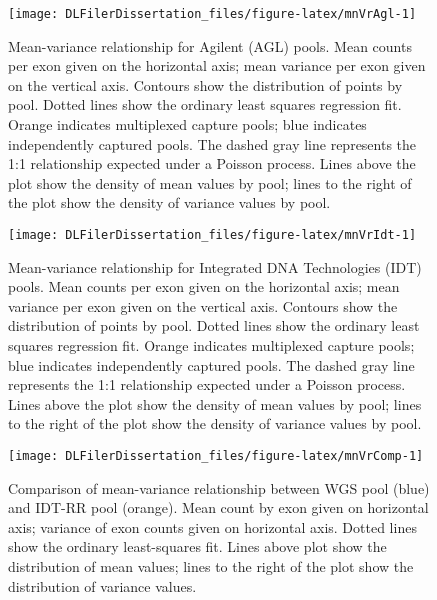\documentclass[11pt,letterpaper]{book}
\begin{document}
\begin{figure}

{\centering \texttt{[image: DLFilerDissertation\_files/figure-latex/mnVrAgl-1]} 

}

\caption[Mean-variance relationship for Agilent (AGL) pools.]{Mean-variance relationship for Agilent (AGL) pools. Mean counts per exon given on the horizontal axis; mean variance per exon given on the vertical axis. Contours show the distribution of points by pool. Dotted lines show the ordinary least squares regression fit. Orange indicates multiplexed capture pools; blue indicates independently captured pools. The dashed gray line represents the 1:1 relationship expected under a Poisson process. Lines above the plot show the density of mean values by pool; lines to the right of the plot show the density of variance values by pool.}\label{fig:mnVrAgl}
\end{figure}



\begin{figure}

{\centering \texttt{[image: DLFilerDissertation\_files/figure-latex/mnVrIdt-1]} 

}

\caption[Mean-variance relationship for Integrated DNA Technologies (IDT) pools.]{Mean-variance relationship for Integrated DNA Technologies (IDT) pools. Mean counts per exon given on the horizontal axis; mean variance per exon given on the vertical axis. Contours show the distribution of points by pool. Dotted lines show the ordinary least squares regression fit. Orange indicates multiplexed capture pools; blue indicates independently captured pools. The dashed gray line represents the 1:1 relationship expected under a Poisson process. Lines above the plot show the density of mean values by pool; lines to the right of the plot show the density of variance values by pool.}\label{fig:mnVrIdt}
\end{figure}





\begin{figure}

{\centering \texttt{[image: DLFilerDissertation\_files/figure-latex/mnVrComp-1]} 

}

\caption[Comparison of mean-variance relationship between WGS pool and IDT-RR pool.]{Comparison of mean-variance relationship between WGS pool (blue) and IDT-RR pool (orange). Mean count by exon given on horizontal axis; variance of exon counts given on horizontal axis. Dotted lines show the ordinary least-squares fit. Lines above plot show the distribution of mean values; lines to the right of the plot show the distribution of variance values.}\label{fig:mnVrComp}
\end{figure}
\end{document}
